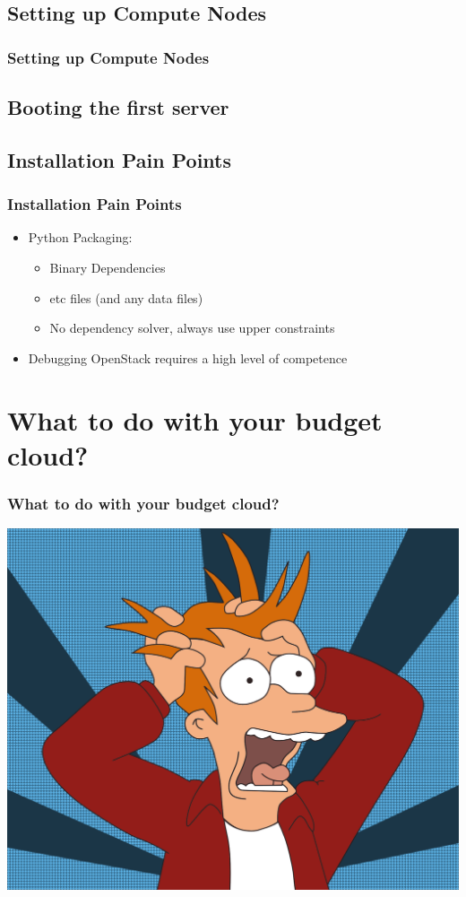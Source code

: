 \documentclass[aspectratio=169,11pt,hyperref={colorlinks=true}]{beamer}
\begin{document}
\subsection{Setting up Compute Nodes}
\begin{frame}
    \frametitle{Setting up Compute Nodes}
        
\end{frame}


\subsection{Booting the first server}
\begin{frame}
    
\end{frame}

\subsection{Installation Pain Points}
\begin{frame}
    \frametitle{Installation Pain Points}
    \begin{itemize}
        \item Python Packaging:
            \begin{itemize}
                \item Binary Dependencies
                \item etc files (and any data files)
                \item No dependency solver, always use upper constraints
            \end{itemize}
        \item Debugging OpenStack requires a high level of competence
    \end{itemize}
\end{frame}

\section{What to do with your budget cloud?}
\begin{frame}
    \frametitle{What to do with your budget cloud?}
    \centering
    \includegraphics[width=.85\textwidth]{futurama-fry.png}
\end{frame}
\end{document}
